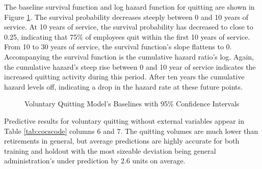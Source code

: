 The baseline survival function and log hazard function for quitting are shown in Figure \ref{fig:vqbasepred}. The survival probability decreases steeply between 0 and 10 years of service. At 10 years of service, the survival probability has decreased to close to 0.25, indicating that 75\% of employees quit within the first 10 years of service. From 10 to 30 years of service, the survival function's slope flattens to 0. Accompanying the survival function is the cumulative hazard ratio's log.  Again, the cumulative hazard's steep rise between 0 and 10 year of service indicates the increased quitting activity during this period. After ten years the cumulative hazard levels off, indicating a drop in the hazard rate at these future points.
\begin{figure}[h!]
	\centering
	\caption{Voluntary Quitting Model's Baselines with 95\% Confidence Intervals}
	\label{fig:vqbasepred}
\end{figure}

Predictive results for voluntary quitting without external variables appear in Table \ref{tab:cocscode} columns 6 and 7. The quitting volumes are much lower than retirements in general, but average predictions are highly accurate for both training and holdout with the most sizeable deviation being general administration's under prediction by 2.6 units on average.


